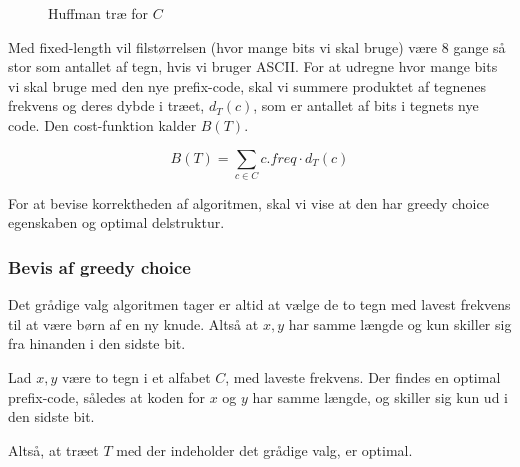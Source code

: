\begin{figure}[H]  
\begin{center}
\caption{Huffman træ for $C$}
\end{center}
\end{figure}

Med fixed-length vil filstørrelsen (hvor mange bits vi skal bruge) være 8 gange så stor som antallet af tegn, hvis vi bruger ASCII. For at udregne hvor mange bits vi skal bruge med den nye prefix-code, skal vi summere produktet af tegnenes frekvens og deres dybde i træet, $d_T(c)$, som er antallet af bits i tegnets nye code. Den cost-funktion kalder $B(T)$.

$$B(T) = \sum_{c \in C} c.freq \cdot d_T(c)$$

For at bevise korrektheden af algoritmen, skal vi vise at den har greedy choice egenskaben og optimal delstruktur.

\subsubsection{Bevis af greedy choice}
Det grådige valg algoritmen tager er altid at vælge de to tegn med lavest frekvens til at være børn af en ny knude. Altså at $x,y$ har samme længde og kun skiller sig fra hinanden i den sidste bit.\\

\begin{lemma}
Lad $x, y$ være to tegn i et alfabet $C$, med laveste frekvens. Der findes en optimal prefix-code, således at koden for $x$ og $y$ har samme længde, og skiller sig kun ud i den sidste bit.\\
\end{lemma}
Altså, at træet $T$ med der indeholder det grådige valg, er optimal.\\

